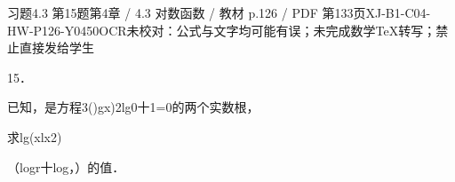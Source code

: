 \begin{bankitem}{习题4.3 第15题}{第4章 / 4.3 对数函数 / 教材 p.126 / PDF 第133页}{XJ-B1-C04-HW-P126-Y0450}{OCR未校对：公式与文字均可能有误；未完成数学TeX转写；禁止直接发给学生}
\begin{ocrdraft}
\par
15．
\par
已知，是方程3()gx)2lg0十1=0的两个实数根，
\par
求lg(xlx2)
\par
（logr十log，）的值．
\end{ocrdraft}
\end{bankitem}
